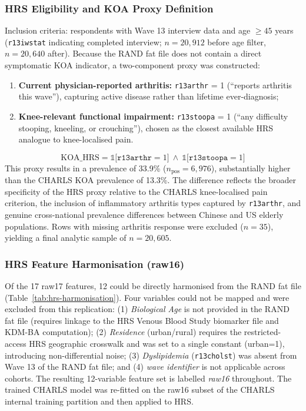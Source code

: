\documentclass[11pt,a4paper]{article}
\begin{document}
\subsubsection*{HRS Eligibility and KOA Proxy Definition}
Inclusion criteria: respondents with Wave 13 interview data and age $\geq 45$ years
(\texttt{r13iwstat} indicating completed interview; $n=20{,}912$ before age filter,
$n=20{,}640$ after). Because the RAND fat file does not contain a direct symptomatic KOA indicator,
a two-component proxy was constructed:
\begin{enumerate}
  \item \textbf{Current physician-reported arthritis:} \texttt{r13arthr} = 1 (``reports arthritis
        this wave''), capturing active disease rather than lifetime ever-diagnosis;
  \item \textbf{Knee-relevant functional impairment:} \texttt{r13stoopa} = 1 (``any difficulty
        stooping, kneeling, or crouching''), chosen as the closest available HRS analogue to
        knee-localised pain.
\end{enumerate}
\[
\text{KOA\_HRS} = \mathbb{1}\bigl[\texttt{r13arthr}=1\bigr]\ \wedge\
\mathbb{1}\bigl[\texttt{r13stoopa}=1\bigr]
\]
This proxy results in a prevalence of 33.9\% ($n_{\text{pos}}=6{,}976$), substantially higher than
the CHARLS KOA prevalence of 13.3\%. The difference reflects the broader specificity of the HRS proxy
relative to the CHARLS knee-localised pain criterion, the inclusion of inflammatory arthritis types
captured by \texttt{r13arthr}, and genuine cross-national prevalence differences between Chinese and
US elderly populations. Rows with missing arthritis response were excluded ($n=35$), yielding a
final analytic sample of $n=20{,}605$.

\subsubsection*{HRS Feature Harmonisation (raw16)}
Of the 17 raw17 features, 12 could be directly harmonised from the RAND fat file
(Table~\ref{tab:hrs-harmonisation}). Four variables could not be mapped and were excluded from this
replication: (1) \emph{Biological Age} is not provided in the RAND fat file (requires linkage to the
HRS Venous Blood Study biomarker file and KDM-BA computation); (2) \emph{Residence} (urban/rural)
requires the restricted-access HRS geographic crosswalk and was set to a single constant (urban=1),
introducing non-differential noise; (3) \emph{Dyslipidemia} (\texttt{r13cholst}) was absent from
Wave 13 of the RAND fat file; and (4) \emph{wave identifier} is not applicable across cohorts.
The resulting 12-variable feature set is labelled \emph{raw16} throughout. The trained CHARLS model
was re-fitted on the raw16 subset of the CHARLS internal training partition and then applied to HRS.
\end{document}
